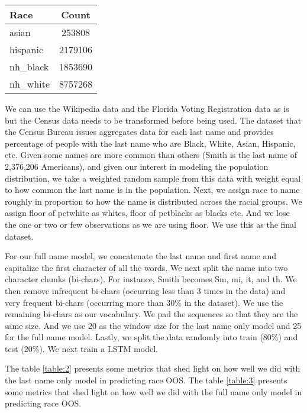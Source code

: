 \documentclass[12pt, letterpaper]{article}
\begin{document}
\begin{table}[h!]
\centering
\begin{tabular}{ l c }
\hline	
Race & Count \\
\hline
asian & 253808 \\
hispanic & 2179106 \\
nh\_black & 1853690 \\
nh\_white & 8757268 \\
\hline
\end{tabular}
\label{table:1}
\end{table}

We can use the Wikipedia data and the Florida Voting Registration data as is but the Census data needs to be transformed before being used. The dataset that the Census Bureau issues aggregates data for each last name and provides percentage of people with the last name who are Black, White, Asian, Hispanic, etc. Given some names are more common than others (Smith is the last name of 2,376,206 Americans), and given our interest in modeling the population distribution, we take a weighted random sample from this data with weight equal to how common the last name is in the population. Next, we assign race to name roughly in proportion to how the name is distributed across the racial groups. We assign floor of pctwhite as whites, floor of pctblacks as blacks etc. And we lose the one or two or few observations as we are using floor. We use this as the final dataset.

For our full name model, we concatenate the last name and first name and capitalize the first character of all the words. We next split the name into two character chunks (bi-chars). For instance, Smith becomes Sm, mi, it, and th. We then remove infrequent bi-chars (occurring less than 3 times in the data) and very frequent bi-chars (occurring more than 30\% in the dataset). We use the remaining bi-chars as our vocabulary. We pad the sequences so that they are the same size. And we use 20 as the window size for the last name only model and 25 for the full name model. Lastly, we split the data randomly into train (80\%) and test (20\%). We next train a LSTM model. 

The table \ref{table:2} presents some metrics that shed light on how well we did with the last name only model in predicting race OOS.  The table \ref{table:3} presents some metrics that shed light on how well we did with the full  name only model in predicting race OOS.  
\end{document}
